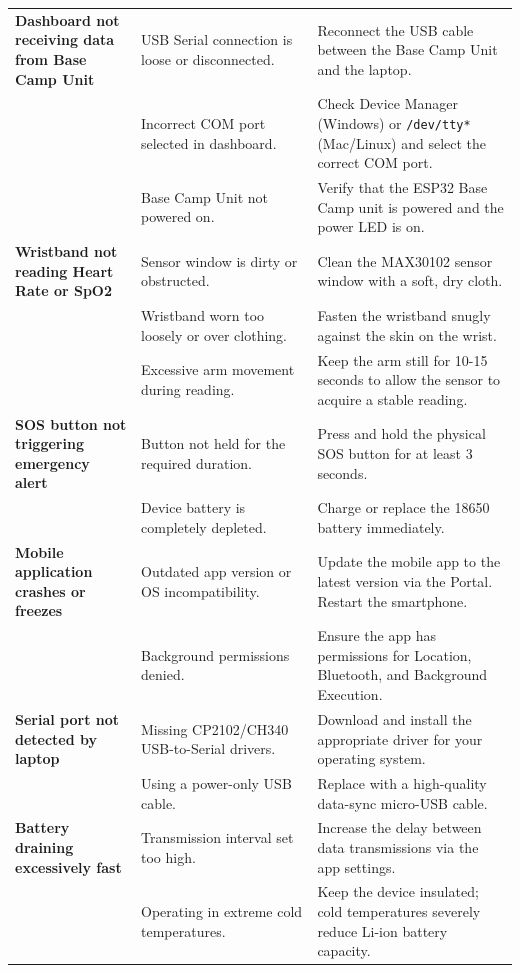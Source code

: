 \begin{table}[htbp]
{\begin{tabular}{@{}p{0.25\linewidth}p{0.35\linewidth}p{0.4\linewidth}@{}}
\textbf{Dashboard not receiving data from Base Camp Unit} & USB Serial connection is loose or disconnected. & Reconnect the USB cable between the Base Camp Unit and the laptop. \\
 & Incorrect COM port selected in dashboard. & Check Device Manager (Windows) or \texttt{/dev/tty*} (Mac/Linux) and select the correct COM port. \\
 & Base Camp Unit not powered on. & Verify that the ESP32 Base Camp unit is powered and the power LED is on. \\

\textbf{Wristband not reading Heart Rate or SpO2} & Sensor window is dirty or obstructed. & Clean the MAX30102 sensor window with a soft, dry cloth. \\
 & Wristband worn too loosely or over clothing. & Fasten the wristband snugly against the skin on the wrist. \\
 & Excessive arm movement during reading. & Keep the arm still for 10-15 seconds to allow the sensor to acquire a stable reading. \\

\textbf{SOS button not triggering emergency alert} & Button not held for the required duration. & Press and hold the physical SOS button for at least 3 seconds. \\
 & Device battery is completely depleted. & Charge or replace the 18650 battery immediately. \\

\textbf{Mobile application crashes or freezes} & Outdated app version or OS incompatibility. & Update the mobile app to the latest version via the Portal. Restart the smartphone. \\
 & Background permissions denied. & Ensure the app has permissions for Location, Bluetooth, and Background Execution. \\

\textbf{Serial port not detected by laptop} & Missing CP2102/CH340 USB-to-Serial drivers. & Download and install the appropriate driver for your operating system. \\
 & Using a power-only USB cable. & Replace with a high-quality data-sync micro-USB cable. \\

\textbf{Battery draining excessively fast} & Transmission interval set too high. & Increase the delay between data transmissions via the app settings. \\
 & Operating in extreme cold temperatures. & Keep the device insulated; cold temperatures severely reduce Li-ion battery capacity. \\
\bottomrule
\end{tabular}
}
\end{table}
